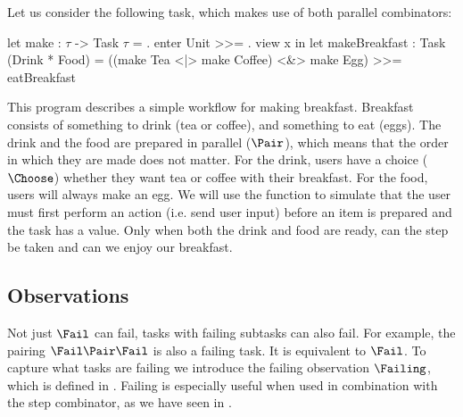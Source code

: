   Let us consider the following task, which makes use of both parallel combinators:
  \begin{TASK}
    let make : $\tau$ -> Task $\tau$ = \x. enter Unit >>= \y. view x in
    let makeBreakfast : Task (Drink * Food) =
      ((make Tea <|> make Coffee) <&> make Egg) >>= eatBreakfast
  \end{TASK}
  This program describes a simple workflow for making breakfast.
  Breakfast consists of something to drink (tea or coffee), and something to eat (eggs).
  The drink and the food are prepared in parallel ($\Pair$), which means that the order in which they are made does not matter.
  For the drink, users have a choice ($\Choose$) whether they want tea or coffee with their breakfast.
  For the food, users will always make an egg.
  We will use the function  to simulate that the user must first perform an action (i.e. send user input) before an item is prepared and the task has a value.
  Only when both the drink and food are ready, can the step be taken and can we enjoy our breakfast.
\stopexample


\subsection[sec:observations]{Observations}

Not just $\Fail$ can fail, tasks with failing subtasks can also fail.
For example, the pairing $\Fail \Pair \Fail$ is also a failing task.
It is equivalent to $\Fail$.
To capture what tasks are failing we introduce the failing observation $\Failing$, which is defined in .
Failing is especially useful when used in combination with the step combinator,
as we have seen in .


  {
    {}}



